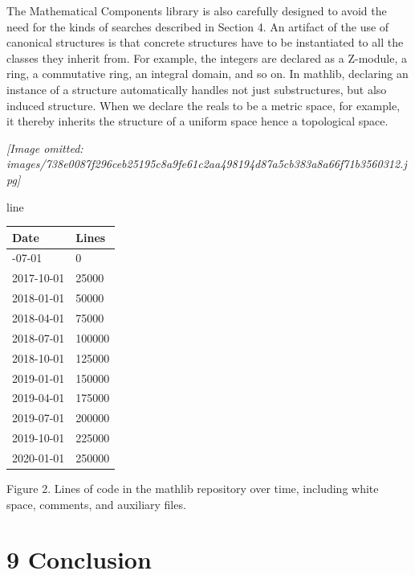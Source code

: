 \documentclass[
]{article}
\newcounter{none} %
\begin{document}
The Mathematical Components library is also carefully designed to avoid
the need for the kinds of searches described in Section 4. An artifact
of the use of canonical structures is that concrete structures have to
be instantiated to all the classes they inherit from. For example, the
integers are declared as a Z-module, a ring, a commutative ring, an
integral domain, and so on. In mathlib, declaring an instance of a
structure automatically handles not just substructures, but also induced
structure. When we declare the reals to be a metric space, for example,
it thereby inherits the structure of a uniform space hence a topological
space.

\textit{[Image omitted: images/738e0087f296ceb25195c8a9fe61c2aa498194d87a5cb383a8a66f71b3560312.jpg]}

line

{\def\LTcaptype{none} %
\begin{longtable}[]{@{}ll@{}}
\toprule\noalign{}
Date & Lines \\
\midrule\noalign{}
\endhead
\bottomrule\noalign{}
\endlastfoot
2017-07-01 & 0 \\
2017-10-01 & 25000 \\
2018-01-01 & 50000 \\
2018-04-01 & 75000 \\
2018-07-01 & 100000 \\
2018-10-01 & 125000 \\
2019-01-01 & 150000 \\
2019-04-01 & 175000 \\
2019-07-01 & 200000 \\
2019-10-01 & 225000 \\
2020-01-01 & 250000 \\
\end{longtable}
}

Figure 2. Lines of code in the mathlib repository over time, including
white space, comments, and auxiliary files.

\section{9 Conclusion}\label{conclusion}
\end{document}
